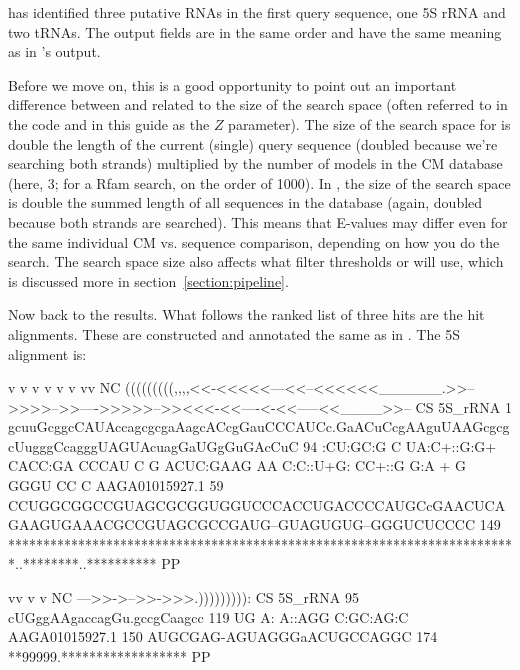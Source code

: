  has identified three putative RNAs in the first query
sequence, one 5S rRNA and two tRNAs. The output fields are in the
same order and have the same meaning as in 's output.

Before we move on, this is a good opportunity to point out an
important difference between  and  related
to the size of the search space (often referred to in the code and in
this guide as the $Z$ parameter).  The size of the search space for
 is double the length of the current (single) query
sequence (doubled because we're searching both strands) multiplied by
the number of models in the CM database (here, 3; for a Rfam search,
on the order of 1000). In , the size of the search
space is double the summed length of all sequences in the database
(again, doubled because both strands are searched). This means that
E-values may differ even for the same individual CM vs. sequence
comparison, depending on how you do the search. The search space size
also affects what filter thresholds  or 
will use, which is discussed more in section~\ref{section:pipeline}.

Now back to the  results. What follows the ranked list of
three hits are the hit alignments. These are constructed and annotated
the same as in . The 5S alignment is:

\begin{sreoutput}
                             v               v       v         v         v             v           vv                NC
                     (((((((((,,,,<<-<<<<<---<<--<<<<<<______.>>-->>>>-->>---->>>>>-->><<<-<<----<-<<-----<<____>>-- CS
         5S_rRNA   1 gcuuGcggcCAUAccagcgcgaAagcACcgGauCCCAUCc.GaACuCcgAAguUAAGcgcgcUugggCcagggUAGUAcuagGaUGgGuGAcCuC 94 
                     :CU:GC:G C UA:C+::G:G+   CACC:GA CCCAU C G ACUC:GAAG  AA C:C::U+G: CC+::G  G:A  + G  GGGU  CC C
  AAGA01015927.1  59 CCUGGCGGCCGUAGCGCGGUGGUCCCACCUGACCCCAUGCcGAACUCAGAAGUGAAACGCCGUAGCGCCGAUG--GUAGUGUG--GGGUCUCCCC 149
                     *************************************************************************..********..********** PP

                        vv         v v          NC
                     --->>->-->>->>>.))))))))): CS
         5S_rRNA  95 cUGggAAgaccagGu.gccgCaagcc 119
                      UG  A: A::AGG   C:GC:AG:C
  AAGA01015927.1 150 AUGCGAG-AGUAGGGaACUGCCAGGC 174
                     **99999.****************** PP
\end{sreoutput}


